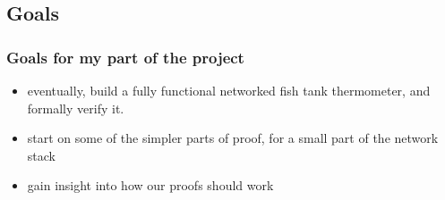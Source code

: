 \documentclass{beamer}
\begin{document}
\subsection{Goals}

\begin{frame}
    \frametitle{Goals for my part of the project}
        \begin{itemize}
            \item eventually, build a fully functional networked fish tank thermometer, and formally verify it.
            \item start on some of the simpler parts of proof, for a small part of the network stack
            \item gain insight into how our proofs should work
        \end{itemize}
\end{frame}
\end{document}
